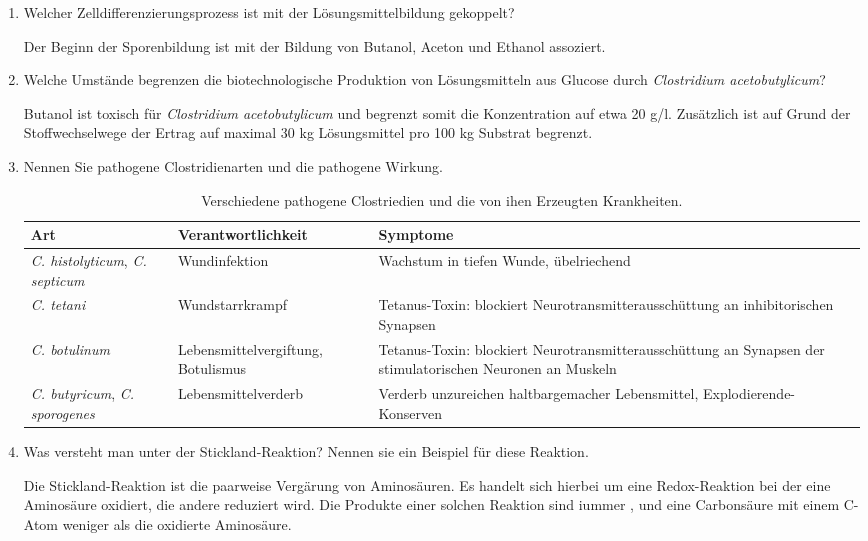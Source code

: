 \begin{enumerate}
	\item Welcher Zelldifferenzierungsprozess ist mit der Lösungsmittelbildung gekoppelt?
		
		Der Beginn der Sporenbildung ist mit der Bildung von Butanol, Aceton und Ethanol assoziert.

	\item Welche Umstände begrenzen die biotechnologische Produktion von Lösungsmitteln aus Glucose durch \emph{Clostridium acetobutylicum}?
			
		Butanol ist toxisch für \emph{Clostridium acetobutylicum} und
		begrenzt somit die Konzentration auf etwa 20 g/l.
		Zusätzlich ist auf Grund der Stoffwechselwege 
		der Ertrag auf maximal 30 kg Lösungsmittel pro 100 kg Substrat begrenzt.
		
	\item Nennen Sie pathogene Clostridienarten und die pathogene Wirkung.
		
		\begin{table}[h!]
		\begin{center}
		\begin{tabular}{p{2.399cm} p{3.4cm} p{5.0cm}} 
		\toprule
		Art	&	Verantwortlichkeit	&	Symptome\\
		\midrule
		\emph{C. histolyticum},	\emph{C. septicum}	&	Wundinfektion				&	Wachstum in tiefen Wunde, übelriechend \\
		\emph{C. tetani}				&	Wundstarrkrampf			&	Tetanus-Toxin: blockiert Neurotransmitterausschüttung  an inhibitorischen Synapsen \\
		\emph{C. botulinum}			&	Lebensmittelvergiftung, Botulismus	&	Tetanus-Toxin: blockiert Neurotransmitterausschüttung an Synapsen der stimulatorischen Neuronen an Muskeln \\
		\emph{C. butyricum}, \emph{C. sporogenes}			&	Lebensmittelverderb		&	Verderb unzureichen haltbargemacher Lebensmittel, Explodierende-Konserven\\
		\bottomrule
		\end{tabular}
		\caption{Verschiedene pathogene Clostriedien und die von ihen Erzeugten Krankheiten.}
		\label{tab:pathClostridien}
		\end{center}
		\end{table}

	\item Was versteht man unter der Stickland-Reaktion? Nennen sie ein Beispiel für diese Reaktion.
		
		Die Stickland-Reaktion ist die paarweise Vergärung von Aminosäuren.
		Es handelt sich hierbei um eine Redox-Reaktion bei der eine Aminosäure oxidiert,
		die andere reduziert wird.
		Die Produkte einer solchen Reaktion sind iummer ,  und 
		eine Carbonsäure mit einem C-Atom weniger als die oxidierte Aminosäure.


\end{enumerate}
